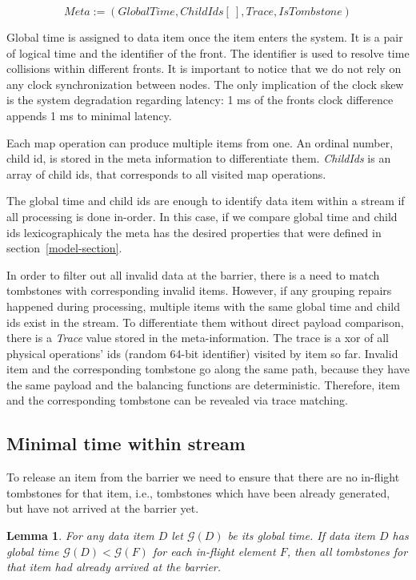 \[Meta := (GlobalTime, ChildIds[\:], Trace, IsTombstone)\]

Global time is assigned to data item once the item enters the system. It is a pair of logical time and the identifier of the front. The identifier is used to resolve time collisions within different fronts. It is important to notice that we do not rely on any clock synchronization between nodes. The only implication of the clock skew is the system degradation regarding latency: 1 ms of the fronts clock difference appends 1 ms to minimal latency.

Each map operation can produce multiple items from one.  An ordinal number, child id, is stored in the meta information to differentiate them. {\it ChildIds} is an array of child ids, that corresponds to all visited map operations.

The global time and child ids are enough to identify data item within a stream if all processing is done in-order. In this case, if we compare global time and child ids lexicographicaly the meta has the desired properties that were defined in section~\ref{model-section}. 

In order to filter out all invalid data at the barrier, there is a need to match tombstones with corresponding invalid items. However, if any grouping repairs happened during processing, multiple items with the same global time and child ids exist in the stream. To differentiate them without direct payload comparison, there is a {\it Trace} value stored in the meta-information. The trace is a xor of all physical operations' ids (random 64-bit identifier) visited by item so far. Invalid item and the corresponding tombstone go along the same path, because they have the same payload and the balancing functions are deterministic. Therefore, item and the corresponding tombstone can be revealed via trace matching. 

\label{mininal-time}

\subsection{Minimal time within stream}

To release an item from the barrier we need to ensure that there are no in-flight tombstones for that item, i.e., tombstones which have been already generated, but have not arrived at the barrier yet.

\newtheorem{minimal-time-claim}{Lemma}

\begin{minimal-time-claim}
  For any data item $D$ let $\mathcal{G} (D)$ be its global time. If data item $D$ has global time $\mathcal{G} (D) < \mathcal{G} (F)$ for each in-flight element $F$, then all tombstones for that item had already arrived at the barrier.
\end{minimal-time-claim}

